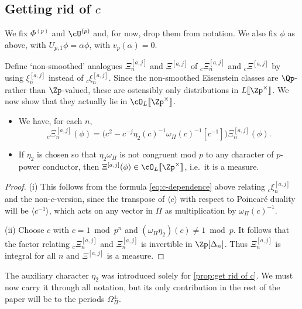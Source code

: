 \documentclass[10pt,reqno,a4paper]{amsart}
\begin{document}
\subsection{Getting rid of \texorpdfstring{$c$}{c}} \label{sec:getting rid of c}

We fix $\Phi^{(p)}$ and $\cU^{(p)}$ and, for now, drop them from notation. We also fix $\phi$ as above, with $U_{p,1}\phi = \alpha\phi$, with $v_p(\alpha) = 0$.

Define `non-smoothed' analogues $\Xi_n^{[a,j]}$ and $\Xi^{[a,j]}$ of ${}_c\Xi_n^{[a,j]}$ and ${}_c\Xi^{[a,j]}$ by using $\xi_n^{[a,j]}$ instead of ${}_c \xi_n^{[a,j]}$. Since the non-smoothed Eisenstein classes are $\Qp$- rather than $\Zp$-valued, these are ostensibly only distributions in $L[\![\Zp^\times]\!]$. We now show that they actually lie in $\cO_L[\![\Zp^\times]\!]$.


\begin{proposition}\label{prop:get rid of c}
\begin{itemize}\setlength{\itemsep}{0pt}
	\item[(i)]	We have, for each $n$,
	\[
		{}_c \Xi_n^{[a,j]}(\phi) = \big(c^2 - c^{-j}\eta_2(c)^{-1}\omega_{\Pi}(c)^{-1} [c^{-1}]\big) \Xi^{[a,j]}_n(\phi).\]
	\item[(ii)] If $\eta_2$ is chosen so that $\eta_2 \omega_{\Pi}$ is not congruent mod $p$ to any character of $p$-power conductor, then $\Xi^{[a,j]}(\phi) \in \cO_L[\![\Zp^\times]\!]$, i.e.\ it is a measure.
\end{itemize}
\end{proposition}
\begin{proof}
(i) This follows from the formula \eqref{eq:c-dependence} above relating ${}_c \xi_n^{[a,j]}$ and the non-$c$-version, since the transpose of $\langle c \rangle$ with respect to Poincar\'e duality will be $\langle c^{-1} \rangle$, which acts on any vector in $\Pi$ as multiplication by $\omega_{\Pi}(c)^{-1}$.

(ii)  Choose $c$ with $c = 1 \bmod p^n$ and  $(\omega_{\Pi} \eta_2)(c) \ne 1 \bmod p$. It follows that the factor relating ${}_c \Xi_n^{[a,j]}$ and $\Xi^{[a,j]}_n$ is invertible in $\Zp[\Delta_n]$. Thus $\Xi^{[a,j]}_n$ is integral for all $n$ and $\Xi^{[a,j]} $ is a measure.
\end{proof}

The auxiliary character $\eta_2$ was introduced solely for \cref{prop:get rid of c}. We must now carry it through all notation, but its only contribution in the rest of the paper will be to the periods $\Omega_\Pi^\pm$.
\end{document}
